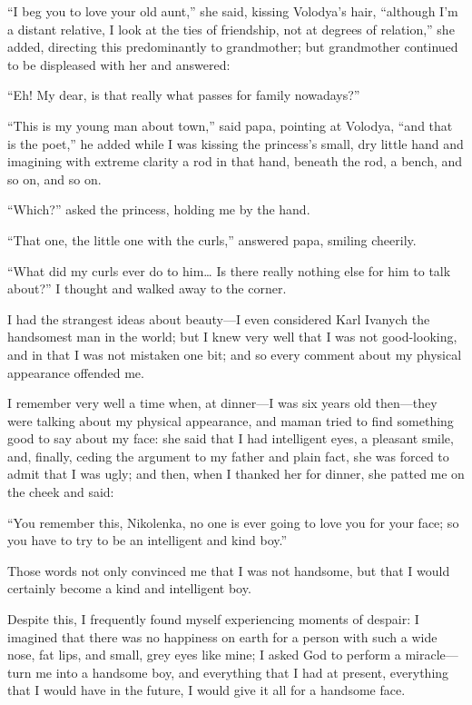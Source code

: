 ``I beg you to love your old aunt,'' she said, kissing Volodya's hair, ``although I'm a distant relative, I look at the ties of friendship, not at degrees of relation,'' she added, directing this predominantly to grandmother; but grandmother continued to be displeased with her and answered:

``Eh! My dear, is that really what passes for family nowadays?'' %

``This is my young man about town,'' said papa, pointing at Volodya, ``and that is the poet,'' he added while I was kissing the princess's small, dry little hand and imagining with extreme clarity a rod in that hand, beneath the rod, a bench, and so on, and so on. %

``Which?'' asked the princess, holding me by the hand. %

``That one, the little one with the curls,'' answered papa, smiling cheerily.

``What did my curls ever do to him\ldots{} Is there really nothing else for him to talk about?'' I thought and walked away to the corner.

I had the strangest ideas about beauty---I even considered Karl Ivanych the handsomest man in the world; but I knew very well that I was not good-looking, and in that I was not mistaken one bit; and so every comment about my physical appearance offended me.

I remember very well a time when, at dinner---I was six years old then---they were talking about my physical appearance, and maman tried to find something good to say about my face: she said that I had intelligent eyes, a pleasant smile, and, finally, ceding the argument to my father and plain fact, she was forced to admit that I was ugly; and then, when I thanked her for dinner, she patted me on the cheek and said:

``You remember this, Nikolenka, no one is ever going to love you for your face; so you have to try to be an intelligent and kind boy.'' %

Those words not only convinced me that I was not handsome, but that I would certainly become a kind and intelligent boy.

Despite this, I frequently found myself experiencing moments of despair: I imagined that there was no happiness on earth for a person with such a wide nose, fat lips, and small, grey eyes like mine; I asked God to perform a miracle---turn me into a handsome boy, and everything that I had at present, everything that I would have in the future, I would give it all for a handsome face.

